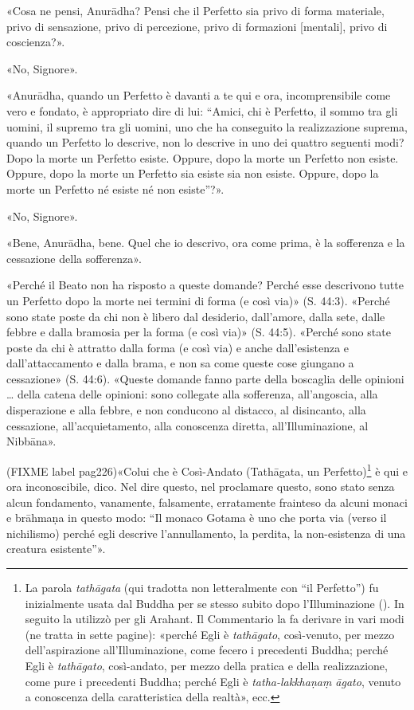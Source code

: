 «Cosa ne pensi, Anurādha? Pensi che il Perfetto sia privo di forma
materiale, privo di sensazione, privo di percezione, privo di formazioni
[mentali], privo di coscienza?».


«No, Signore».


«Anurādha, quando un Perfetto è davanti a te qui e ora, incomprensibile
come vero e fondato, è appropriato dire di lui: “Amici, chi è Perfetto,
il sommo tra gli uomini, il supremo tra gli uomini, uno che ha
conseguito la realizzazione suprema, quando un Perfetto lo descrive, non
lo descrive in uno dei quattro seguenti modi? Dopo la morte un Perfetto
esiste. Oppure, dopo la morte un Perfetto non esiste. Oppure, dopo la
morte un Perfetto sia esiste sia non esiste. Oppure, dopo la morte un
Perfetto né esiste né non esiste”?».


«No, Signore».


«Bene, Anurādha, bene. Quel che io descrivo, ora come prima, è la
sofferenza e la cessazione della sofferenza».




«Perché il Beato non ha risposto a queste domande? Perché esse
descrivono tutte un Perfetto dopo la morte nei termini di forma (e così
via)» (S. 44:3). «Perché sono state poste da chi non è libero dal
desiderio, dall’amore, dalla sete, dalle febbre e dalla bramosia per la
forma (e così via)» (S. 44:5). «Perché sono state poste da chi è
attratto dalla forma (e così via) e anche dall’esistenza e
dall’attaccamento e dalla brama, e non sa come queste cose giungano a
cessazione» (S. 44:6). «Queste domande fanno parte della boscaglia delle
opinioni … della catena delle opinioni: sono collegate alla sofferenza,
all’angoscia, alla disperazione e alla febbre, e non conducono al
distacco, al disincanto, alla cessazione, all’acquietamento, alla
conoscenza diretta, all’Illuminazione, al Nibbāna».




(FIXME label pag226)«Colui che è Così-Andato (Tathāgata, un Perfetto)\footnote{La parola \emph{tathāgata} (qui tradotta non letteralmente con “il Perfetto”) fu inizialmente usata dal Buddha per se stesso subito dopo l’Illuminazione (\hyperlink{cap-03-Dopo-l-Illuminazione#pag41}{}). In seguito la utilizzò per gli Arahant. Il Commentario la fa derivare in vari modi (ne tratta in sette pagine): «perché Egli è \emph{tathāgato}, così-venuto, per mezzo dell’aspirazione all’Illuminazione, come fecero i precedenti Buddha; perché Egli è \emph{tathāgato}, così-andato, per mezzo della pratica e della realizzazione, come pure i precedenti Buddha; perché Egli è \emph{tatha-lakkhaṇaṃ āgato}, venuto a conoscenza della caratteristica della realtà», ecc.} è qui
e ora inconoscibile, dico. Nel dire questo, nel proclamare questo, sono
stato senza alcun fondamento, vanamente, falsamente, erratamente
frainteso da alcuni monaci e brāhmaṇa in questo modo: “Il monaco Gotama
è uno che porta via (verso il nichilismo) perché egli descrive
l’annullamento, la perdita, la non-esistenza di una creatura
esistente”».


